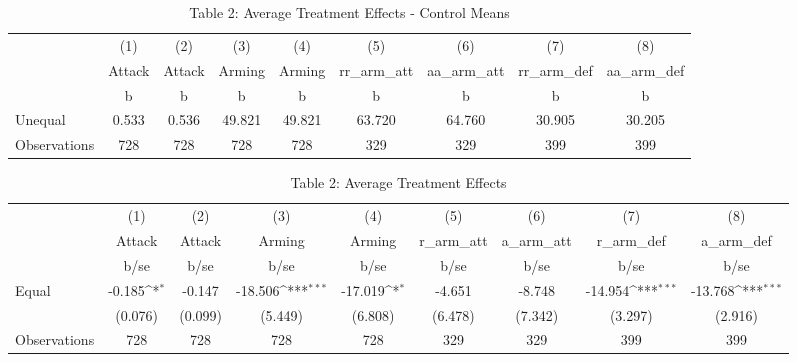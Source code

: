 \begin{table}[htbp]\centering
\def\sym#1{\ifmmode^{#1}\else\(^{#1}\)\fi}
\caption{Table 2: Average Treatment Effects - Control Means}
\begin{tabular}{l*{8}{c}}
\hline\hline
                    &\multicolumn{1}{c}{(1)}&\multicolumn{1}{c}{(2)}&\multicolumn{1}{c}{(3)}&\multicolumn{1}{c}{(4)}&\multicolumn{1}{c}{(5)}&\multicolumn{1}{c}{(6)}&\multicolumn{1}{c}{(7)}&\multicolumn{1}{c}{(8)}\\
                    &\multicolumn{1}{c}{Attack}&\multicolumn{1}{c}{Attack}&\multicolumn{1}{c}{Arming}&\multicolumn{1}{c}{Arming}&\multicolumn{1}{c}{rr\_arm\_att}&\multicolumn{1}{c}{aa\_arm\_att}&\multicolumn{1}{c}{rr\_arm\_def}&\multicolumn{1}{c}{aa\_arm\_def}\\
                    &           b&           b&           b&           b&           b&           b&           b&           b\\
\hline
Unequal             &       0.533&       0.536&      49.821&      49.821&      63.720&      64.760&      30.905&      30.205\\
\hline
Observations        &         728&         728&         728&         728&         329&         329&         399&         399\\
\hline\hline
\end{tabular}
\end{table}
\begin{table}[htbp]\centering
\def\sym#1{\ifmmode^{#1}\else\(^{#1}\)\fi}
\caption{Table 2: Average Treatment Effects}
\begin{tabular}{l*{8}{c}}
\hline\hline
                    &\multicolumn{1}{c}{(1)}&\multicolumn{1}{c}{(2)}&\multicolumn{1}{c}{(3)}&\multicolumn{1}{c}{(4)}&\multicolumn{1}{c}{(5)}&\multicolumn{1}{c}{(6)}&\multicolumn{1}{c}{(7)}&\multicolumn{1}{c}{(8)}\\
                    &\multicolumn{1}{c}{Attack}&\multicolumn{1}{c}{Attack}&\multicolumn{1}{c}{Arming}&\multicolumn{1}{c}{Arming}&\multicolumn{1}{c}{r\_arm\_att}&\multicolumn{1}{c}{a\_arm\_att}&\multicolumn{1}{c}{r\_arm\_def}&\multicolumn{1}{c}{a\_arm\_def}\\
                    &        b/se         &        b/se         &        b/se         &        b/se         &        b/se         &        b/se         &        b/se         &        b/se         \\
\hline
Equal               &      -0.185\sym{*}  &      -0.147         &     -18.506\sym{***}&     -17.019\sym{*}  &      -4.651         &      -8.748         &     -14.954\sym{***}&     -13.768\sym{***}\\
                    &     (0.076)         &     (0.099)         &     (5.449)         &     (6.808)         &     (6.478)         &     (7.342)         &     (3.297)         &     (2.916)         \\
\hline
Observations        &         728         &         728         &         728         &         728         &         329         &         329         &         399         &         399         \\
\hline\hline
\end{tabular}
\end{table}
